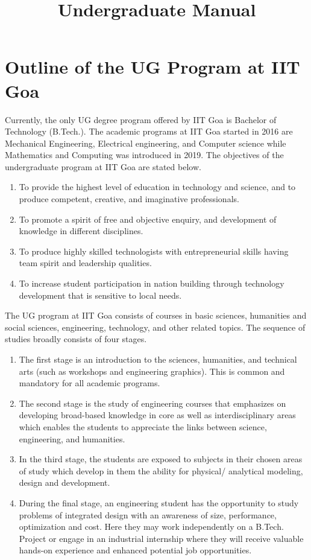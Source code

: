 \documentclass[a4paper, 12pt]{article}
\title{{\Huge Undergraduate Manual }}
\begin{document}
\maketitle
\pagebreak



\section{Outline of the UG Program at IIT Goa}
	
	Currently, the only UG degree program offered by IIT Goa is Bachelor of Technology (B.Tech.). The academic programs at IIT Goa started in 2016 are Mechanical Engineering, Electrical engineering, and Computer science while Mathematics and Computing was introduced in 2019. The objectives of the undergraduate program at IIT Goa are stated below.
	
	\begin{enumerate}
	\item To provide the highest level of education in technology and science, and to produce competent, creative, and imaginative professionals.
	\item To promote a spirit of free and objective enquiry, and development of knowledge in different disciplines. 
	\item To produce highly skilled technologists with entrepreneurial skills having team spirit and leadership qualities. 
	\item To increase student participation in nation building through technology development that is sensitive to local needs.
	\end{enumerate}
	 
	The UG program at IIT Goa consists of courses in basic sciences, humanities and social sciences, engineering, technology, and other related topics. The sequence of studies broadly consists of four stages.
	\begin{enumerate}
		 
	\item The first stage is an introduction to the sciences, humanities, and technical arts (such as workshops and engineering graphics). This is common and mandatory for all academic programs. 
	\item The second stage is the study of engineering courses that emphasizes on developing broad-based knowledge in core as well as interdisciplinary areas which enables the students to appreciate the links between science, engineering, and humanities. 
	\item In the third stage, the students are exposed to subjects in their chosen areas of study which develop in them the ability for physical/ analytical modeling, design and development. 
	\item During the final stage, an engineering student has the opportunity to study problems of integrated design with an awareness of size, performance, optimization and cost. Here they may work independently on a B.Tech. Project or engage in an industrial internship where they will receive valuable hands-on experience and enhanced potential job opportunities.
\end{enumerate}
\end{document}
